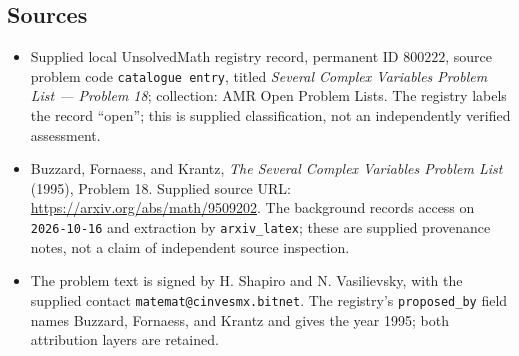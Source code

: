 \documentclass[11pt]{article}
\begin{document}
\subsection{Sources}
\begin{itemize}
\item Supplied local UnsolvedMath registry record, permanent ID \(800222\), source problem code \texttt{catalogue entry}, titled \emph{Several Complex Variables Problem List --- Problem 18}; collection: AMR Open Problem Lists. The registry labels the record ``open''; this is supplied classification, not an independently verified assessment.
\item Buzzard, Fornaess, and Krantz, \emph{The Several Complex Variables Problem List} (1995), Problem 18. Supplied source URL: \url{https://arxiv.org/abs/math/9509202}. The background records access on \texttt{2026-10-16} and extraction by \texttt{arxiv\_latex}; these are supplied provenance notes, not a claim of independent source inspection.
\item The problem text is signed by H. Shapiro and N. Vasilievsky, with the supplied contact \texttt{matemat@cinvesmx.bitnet}. The registry's \texttt{proposed\_by} field names Buzzard, Fornaess, and Krantz and gives the year 1995; both attribution layers are retained.
\end{itemize}
\end{document}
